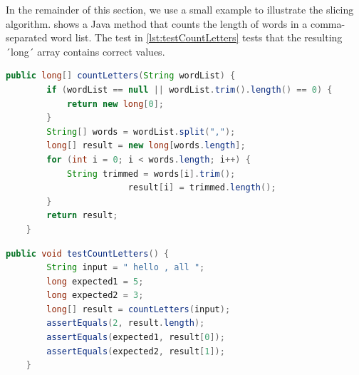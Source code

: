 In the remainder of this section, we use a small example to illustrate the slicing algorithm.
 shows a Java method that counts the length of words in a comma-separated word list.
The test in \cref{lst:testCountLetters} tests that the resulting ´long´ array contains correct values.

\begin{lstlisting}[float,caption={A method to count letters in a word list.},stepnumber=2,numberfirstline=false,label=lst:countLetters,language=Java]
    public long[] countLetters(String wordList) {
        if (wordList == null || wordList.trim().length() == 0) {
            return new long[0];
        }
        String[] words = wordList.split(",");
        long[] result = new long[words.length];
        for (int i = 0; i < words.length; i++) {
            String trimmed = words[i].trim();
						result[i] = trimmed.length();
        }
        return result;
    }
\end{lstlisting}

\begin{lstlisting}[float,caption={A test for countLetters.},stepnumber=2,numberfirstline=false,label=lst:testCountLetters,language=Java]
    public void testCountLetters() {
        String input = " hello , all ";
        long expected1 = 5;
        long expected2 = 3;
        long[] result = countLetters(input);
        assertEquals(2, result.length);
        assertEquals(expected1, result[0]);
        assertEquals(expected2, result[1]);
    }
\end{lstlisting}

